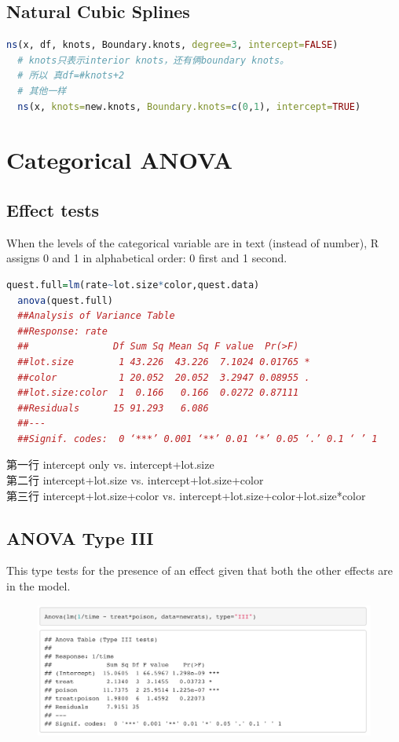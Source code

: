 \documentclass[11pt,a4paper]{article}
\begin{document}
\subsection{Natural Cubic Splines}
\begin{lstlisting}[language=R]
  ns(x, df, knots, Boundary.knots, degree=3, intercept=FALSE)
  # knots只表示interior knots，还有俩boundary knots。
  # 所以 真df=#knots+2
  # 其他一样
  ns(x, knots=new.knots, Boundary.knots=c(0,1), intercept=TRUE)
\end{lstlisting}



\section{Categorical ANOVA}
\subsection{Effect tests}
When the levels of the categorical variable are in text (instead of number), R assigns 0 and 1 in alphabetical order: 0 first and 1 second.

\begin{lstlisting}[language=R]
  quest.full=lm(rate~lot.size*color,quest.data)
  anova(quest.full)
  ##Analysis of Variance Table
  ##Response: rate
  ##               Df Sum Sq Mean Sq F value  Pr(>F)  
  ##lot.size        1 43.226  43.226  7.1024 0.01765 *
  ##color           1 20.052  20.052  3.2947 0.08955 .
  ##lot.size:color  1  0.166   0.166  0.0272 0.87111  
  ##Residuals      15 91.293   6.086                  
  ##---
  ##Signif. codes:  0 ‘***’ 0.001 ‘**’ 0.01 ‘*’ 0.05 ‘.’ 0.1 ‘ ’ 1
\end{lstlisting}
第一行 intercept only vs. intercept+lot.size\\
第二行 intercept+lot.size vs. intercept+lot.size+color\\
第三行 intercept+lot.size+color vs. intercept+lot.size+color+lot.size*color

\subsection{ANOVA Type III}
This type tests for the presence of an effect given that both the other effects are in the model.
\begin{center}\begin{figure}[htbp]
  \centering
  \includegraphics[scale=0.3]{type3}
  \caption{}
  \label{}
\end{figure}\end{center}
\end{document}
